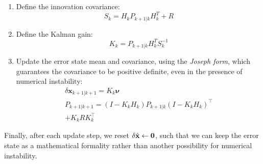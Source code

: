 \begin{enumerate}
  \item Define the innovation covariance:
    \begin{equation}
      S_k = H_k P_{k+1|k} H_k^T + R
    \end{equation}
  \item Define the Kalman gain:
    \begin{equation}
      K_k = P_{k+1|k} H_k^T S_k^{-1}
    \end{equation}
  \item Update the error state mean and covariance, using the \textit{Joseph form}, which guarantees the covariance to be positive definite, even in the presence of numerical instability:
    \begin{equation}
      \begin{gathered}
        \delta \mathbf{x}_{k+1|k+1} = K_k \boldsymbol{\nu} \\
        P_{k+1|k+1} = (I - K_k H_k) P_{k+1|k} (I - K_k H_k)^\top \\
        + K_k R K_k^\top
      \end{gathered}
    \end{equation}
\end{enumerate}

Finally, after each update step, we reset $\delta \hat{\mathbf{x}}\leftarrow \mathbf{0}$, such that we can keep the error state as a mathematical formality rather than another possibility for numerical instability.
